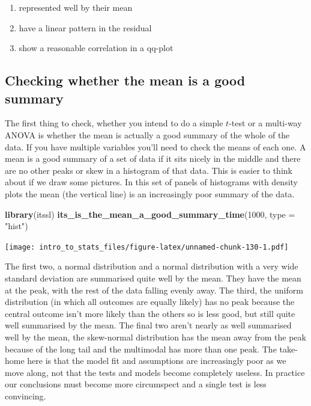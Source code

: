 \documentclass[
]{book}
\newenvironment{Shaded}{\begin{snugshade}}{\end{snugshade}}
\newcommand{\DataTypeTok}[1]{\textcolor[rgb]{0.13,0.29,0.53}{#1}}
\newcommand{\DecValTok}[1]{\textcolor[rgb]{0.00,0.00,0.81}{#1}}
\newcommand{\KeywordTok}[1]{\textcolor[rgb]{0.13,0.29,0.53}{\textbf{#1}}}
\newcommand{\NormalTok}[1]{#1}
\newcommand{\StringTok}[1]{\textcolor[rgb]{0.31,0.60,0.02}{#1}}
\providecommand{\tightlist}{%
  \setlength{\itemsep}{0pt}\setlength{\parskip}{0pt}}
\begin{document}
\begin{enumerate}
\def\labelenumi{\arabic{enumi}.}
\tightlist
\item
  represented well by their mean
\item
  have a linear pattern in the residual
\item
  show a reasonable correlation in a qq-plot
\end{enumerate}

\hypertarget{checking-whether-the-mean-is-a-good-summary}{%
\subsection{Checking whether the mean is a good summary}\label{checking-whether-the-mean-is-a-good-summary}}

The first thing to check, whether you intend to do a simple \(t\)-test or a multi-way ANOVA is whether the mean is actually a good summary of the whole of the data. If you have multiple variables you'll need to check the means of each one. A mean is a good summary of a set of data if it sits nicely in the middle and there are no other peaks or skew in a histogram of that data. This is easier to think about if we draw some pictures. In this set of panels of histograms with density plots the mean (the vertical line) is an increasingly poor summary of the data.

\begin{Shaded}
\begin{Highlighting}[]
\KeywordTok{library}\NormalTok{(itssl)}
\KeywordTok{its_is_the_mean_a_good_summary_time}\NormalTok{(}\DecValTok{1000}\NormalTok{, }\DataTypeTok{type =} \StringTok{"hist"}\NormalTok{)}
\end{Highlighting}
\end{Shaded}

\texttt{[image: intro\_to\_stats\_files/figure-latex/unnamed-chunk-130-1.pdf]}

The first two, a normal distribution and a normal distribution with a very wide standard deviation are summarised quite well by the mean. They have the mean at the peak, with the rest of the data falling evenly away. The third, the uniform distribution (in which all outcomes are equally likely) has no peak because the central outcome isn't more likely than the others so is less good, but still quite well summarised by the mean. The final two aren't nearly as well summarised well by the mean, the skew-normal distribution has the mean away from the peak because of the long tail and the multimodal has more than one peak. The take-home here is that the model fit and assumptions are increasingly poor as we move along, not that the tests and models become completely useless. In practice our conclusions must become more circumspect and a single test is less convincing.
\end{document}
